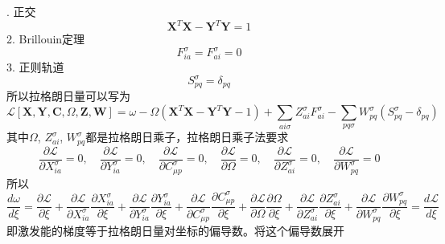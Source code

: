 \documentclass[11pt]{ctexart}
\numberwithin{equation}{section}
\begin{document}
. 正交
\begin{equation}
    \mathbf{X}^{T}\mathbf{X} - \mathbf{Y}^{T}\mathbf{Y} = 1
\end{equation}
2. Brillouin定理
\begin{equation}
    F_{ia}^{\sigma} = F_{ai}^{\sigma} = 0
\end{equation}
3. 正则轨道
\begin{equation}
    S_{pq}^{\sigma} = \delta_{pq}
\end{equation}
所以拉格朗日量可以写为
\begin{equation}
    \mathcal{L}[\mathbf{X}, \mathbf{Y}, \mathbf{C}, \Omega, \mathbf{Z}, \mathbf{W}]
    = \omega 
    - \Omega(\mathbf{X}^{T}\mathbf{X}-\mathbf{Y}^{T}\mathbf{Y} - 1)
    + \sum_{ai\sigma}Z_{ai}^{\sigma}F_{ai}^{\sigma}
    - \sum_{pq\sigma}W_{pq}^{\sigma}(S_{pq}^{\sigma}-\delta_{pq})
\end{equation}
其中$\Omega$, $Z_{ai}^{\sigma}$, $W_{pq}^{\sigma}$都是拉格朗日乘子，拉格朗日乘子法要求
\begin{equation}
    \frac{\partial \mathcal{L}}{\partial X_{ia}^{\sigma}} = 0,
    \quad \frac{\partial \mathcal{L}}{\partial Y_{ia}^{\sigma}} = 0,
    \quad \frac{\partial \mathcal{L}}{\partial C_{\mu p}^{\sigma}} = 0,
    \quad \frac{\partial \mathcal{L}}{\partial \Omega} = 0 ,
    \quad \frac{\partial \mathcal{L}}{\partial Z_{ai}^{\sigma}} = 0 ,
    \quad \frac{\partial \mathcal{L}}{\partial W_{pq}^{\sigma}} = 0 
\end{equation}
所以
\begin{equation}
    \frac{d \omega}{d \xi} 
    = \frac{\partial\mathcal{L}}{\partial \xi}
    + \frac{\partial\mathcal{L}}{\partial X_{ia}^{\sigma}}\frac{\partial X_{ia}^{\sigma}}{\partial \xi}
    + \frac{\partial\mathcal{L}}{\partial Y_{ia}^{\sigma}}\frac{\partial Y_{ia}^{\sigma}}{\partial \xi}
    + \frac{\partial\mathcal{L}}{\partial C_{\mu p}^{\sigma}}\frac{\partial C_{\mu p}^{\sigma}}{\partial \xi}
    + \frac{\partial\mathcal{L}}{\partial \Omega}\frac{\partial \Omega}{\partial \xi}
    + \frac{\partial\mathcal{L}}{\partial Z_{ai}^{\sigma}}\frac{\partial Z_{ai}^{\sigma}}{\partial \xi}
    + \frac{\partial\mathcal{L}}{\partial W_{pq}^{\sigma}}\frac{\partial W_{pq}^{\sigma}}{\partial \xi}
    = \frac{d \mathcal{L}}{d\xi}
\end{equation}
即激发能的梯度等于拉格朗日量对坐标的偏导数。将这个偏导数展开
\end{document}
